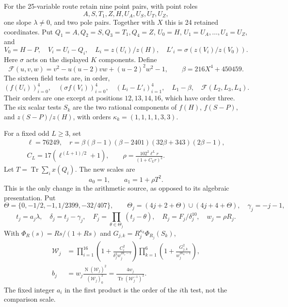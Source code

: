 \documentclass[11pt,a4paper]{article}
\theoremstyle{remark}\newtheorem{remark}[theorem]{Remark}
\DeclareMathOperator{\Tr}{Tr}\DeclareMathOperator{\N}{N}\DeclareMathOperator{\Disc}{Disc}
\begin{document}
For the 25-variable route retain nine point pairs, with point roles
\[
 A,S,T_1,Z,H,U_A,U_S,U_T,U_Z,
\]
one slope $\lambda\ne0$, and two pole pairs. Together with $X$ this
is 24 retained coordinates. Put $Q_1=A,Q_2=S,Q_3=T_1,Q_4=Z$,
$U_0=H$, $U_1=U_A,\ldots,U_4=U_Z$, and
\[
 V_0=H-P,\quad V_i=U_i-Q_i,\quad
 L_i=z(U_i)/z(H),\quad L'_i=\sigma(z(V_i)/z(V_0)).
\]
Here $\sigma$ acts on the displayed $K$ components. Define
\[
 \mathcal F(u,v,w)=v^2-u(u-2)vw+(u-2)^2w^2-1,
 \qquad \beta=216X^4+450459.
\]
The sixteen field tests are, in order,
\[
 (f(U_i))_{i=0}^4,\quad(\sigma f(V_i))_{i=0}^4,\quad
 (L_i-L'_i)_{i=1}^4,\quad L_1-\beta,\quad
 \mathcal F(L_2,L_3,L_4).
\]
Their orders are one except at positions $12,13,14,16$, which have
order three. The six scalar tests $S_k$ are the two rational components
of $f(H)$, $f(S-P)$, and $z(S-P)/z(H)$, with orders
$\kappa_k=(1,1,1,1,3,3)$.

For a fixed odd $L\ge3$, set
\begin{equation}\label{eq:rho}
\begin{gathered}
 \ell=76249,\quad
 r=\beta(\beta-1)(\beta-2401)(32\beta+343)(2\beta-1),\\
 C_L=17(\ell^{(L+1)/2}+1),\qquad
 \rho=\frac{102^2\ell^Lr}{(1+C_Lr)^2}.
\end{gathered}
\end{equation}
Let $T=\Tr\sum_i x(Q_i)$. The new scales are
\begin{equation}\label{eq:unsquared}
                         a_0=1,\qquad a_1=1+\rho T^2.
\end{equation}
This is the only change in the arithmetic source, as opposed to its
algebraic presentation. Put
\[
 \Theta=\{0,-1/2,-1,1/2399,-32/407\},\qquad
 \Theta_j=(4j+2+\Theta)\cup(4j+4+\Theta),\quad \gamma_j=-j-1,
\]
\[
 t_j=a_j\lambda,\quad \delta_j=t_j-\gamma_j,\quad
 F_j=\prod_{\theta\in\Theta_j}(t_j-\theta),\quad
 R_j=F_j/\delta_j^{10},\quad w_j=\rho R_j.
\]
With $\Phi_R(s)=Rs/(1+Rs)$ and $G_{j,k}=R_j^{\kappa_k}\Phi_{R_j}(S_k)$,
\begin{equation}\label{eq:detectors}
\begin{split}
 \mathcal W_j&=\prod_{i=1}^{16}
 \left(1+\frac{C_i^2}{\delta_j^2w_j^{2a_i-1}}\right)
 \prod_{k=1}^{6}\left(1+\frac{G_{j,k}^2}{w_j^{2\kappa_k-1}}\right),\\
 b_j&=w_j\frac{\N(\mathcal W_j)^2}{(\mathcal W_j)_0^2}
       =\frac{4w_j}{\Tr(\mathcal W_j^{-1})^2}.
\end{split}
\end{equation}
The fixed integer $a_i$ in the first product is the order of the $i$th
test, not the comparison scale.
\end{document}
